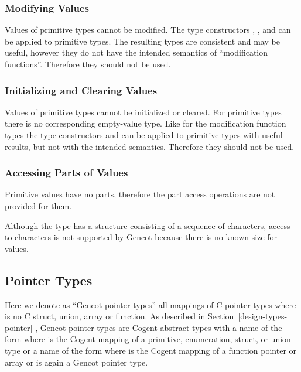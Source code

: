 \subsubsection{Modifying Values}

Values of primitive types cannot be modified. The type constructors , , and 
can be applied to primitive types. The resulting types are consistent and may be useful, however they do not have the
intended semantics of ``modification functions''. Therefore they should not be used.

\subsubsection{Initializing and Clearing Values}

Values of primitive types cannot be initialized or cleared. For primitive types there is no corresponding empty-value type.
Like for the modification function types the type constructors
 and  can be applied to primitive types with useful results, but not with the intended semantics.
Therefore they should not be used.

\subsubsection{Accessing Parts of Values}

Primitive values have no parts, therefore the part access operations are not provided for them.

Although the type  has a structure consisting of a sequence of characters, access to characters is not supported
by Gencot because there is no known size for  values.

\subsection{Pointer Types}
\label{design-operations-pointer}

Here we denote as ``Gencot pointer types'' all mappings of C pointer types  where  is no C struct, union, array or function.
As described in Section~\ref{design-types-pointer} , Gencot pointer types are 
Cogent abstract types with a name of the form  where  is the Cogent mapping of a primitive, enumeration, struct, or union 
type  or a name of the form  where  is the Cogent mapping of a function pointer or array or  is again a 
Gencot pointer type.

